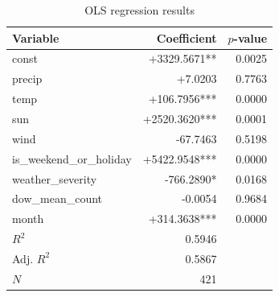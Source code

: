 \begin{table}[htbp]
\centering
\caption{OLS regression results}
\label{tab:ols}
\begin{tabular}{lrr}
\toprule
Variable & Coefficient & $p$-value \\
\midrule
  const & +3329.5671** & 0.0025 \\
  precip & +7.0203 & 0.7763 \\
  temp & +106.7956*** & 0.0000 \\
  sun & +2520.3620*** & 0.0001 \\
  wind & -67.7463 & 0.5198 \\
  is\_weekend\_or\_holiday & +5422.9548*** & 0.0000 \\
  weather\_severity & -766.2890* & 0.0168 \\
  dow\_mean\_count & -0.0054 & 0.9684 \\
  month & +314.3638*** & 0.0000 \\
\midrule
  $R^2$ & 0.5946 & \\
  Adj. $R^2$ & 0.5867 & \\
  $N$ & 421 & \\
\bottomrule
\end{tabular}
\end{table}